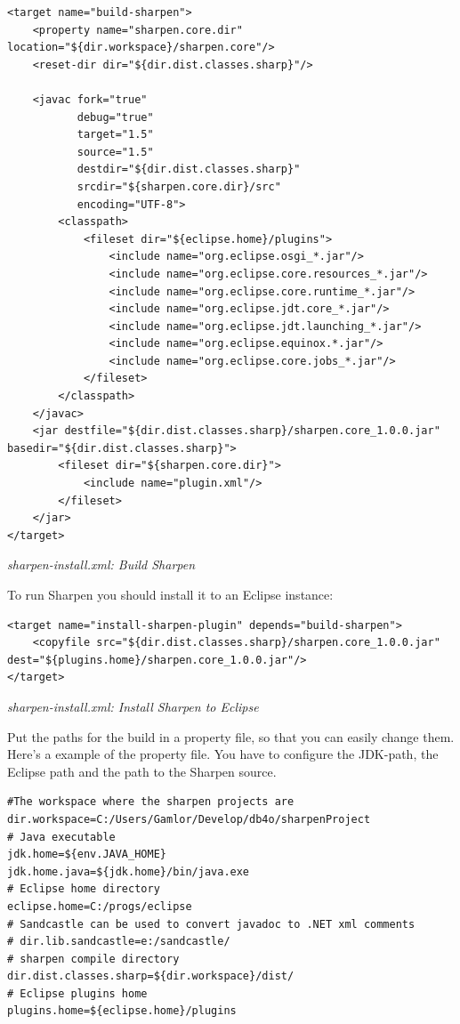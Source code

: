 \begin{lstlisting}
<target name="build-sharpen">
    <property name="sharpen.core.dir" location="${dir.workspace}/sharpen.core"/>
    <reset-dir dir="${dir.dist.classes.sharp}"/>

    <javac fork="true"
           debug="true"
           target="1.5"
           source="1.5"
           destdir="${dir.dist.classes.sharp}"
           srcdir="${sharpen.core.dir}/src"
           encoding="UTF-8">
        <classpath>
            <fileset dir="${eclipse.home}/plugins">
                <include name="org.eclipse.osgi_*.jar"/>
                <include name="org.eclipse.core.resources_*.jar"/>
                <include name="org.eclipse.core.runtime_*.jar"/>
                <include name="org.eclipse.jdt.core_*.jar"/>
                <include name="org.eclipse.jdt.launching_*.jar"/>
                <include name="org.eclipse.equinox.*.jar"/>
                <include name="org.eclipse.core.jobs_*.jar"/>
            </fileset>
        </classpath>
    </javac>
    <jar destfile="${dir.dist.classes.sharp}/sharpen.core_1.0.0.jar" basedir="${dir.dist.classes.sharp}">
        <fileset dir="${sharpen.core.dir}">
            <include name="plugin.xml"/>
        </fileset>
    </jar>
</target>
\end{lstlisting}

{\small\itshape sharpen-install.xml: Build Sharpen\par}
\medskip

To run Sharpen you should install it to an Eclipse instance:

\begin{lstlisting}
<target name="install-sharpen-plugin" depends="build-sharpen">
    <copyfile src="${dir.dist.classes.sharp}/sharpen.core_1.0.0.jar" dest="${plugins.home}/sharpen.core_1.0.0.jar"/>
</target>
\end{lstlisting}

{\small\itshape sharpen-install.xml: Install Sharpen to Eclipse\par}
\medskip

Put the paths for the build in a property file, so that you can easily change them. Here's a example of the property file. You have to configure the JDK-path, the Eclipse path and the path to the Sharpen source.

\begin{lstlisting}
#The workspace where the sharpen projects are
dir.workspace=C:/Users/Gamlor/Develop/db4o/sharpenProject
# Java executable
jdk.home=${env.JAVA_HOME}
jdk.home.java=${jdk.home}/bin/java.exe
# Eclipse home directory
eclipse.home=C:/progs/eclipse
# Sandcastle can be used to convert javadoc to .NET xml comments
# dir.lib.sandcastle=e:/sandcastle/
# sharpen compile directory
dir.dist.classes.sharp=${dir.workspace}/dist/
# Eclipse plugins home
plugins.home=${eclipse.home}/plugins
\end{lstlisting}

